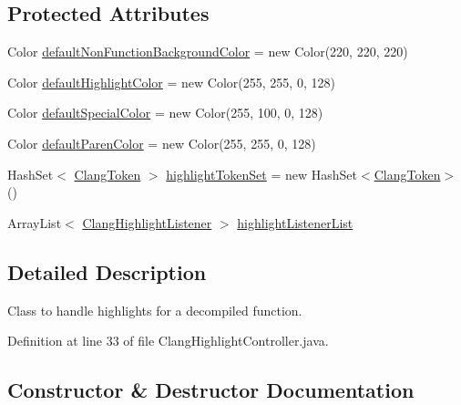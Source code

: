 \subsection*{Protected Attributes}
\begin{DoxyCompactItemize}
\item 
Color \mbox{\hyperlink{classghidra_1_1app_1_1decompiler_1_1component_1_1_clang_highlight_controller_a83b3026daf161b48e0d180a2c0935579}{default\+Non\+Function\+Background\+Color}} = new Color(220, 220, 220)
\item 
Color \mbox{\hyperlink{classghidra_1_1app_1_1decompiler_1_1component_1_1_clang_highlight_controller_a4998d07a38b79aef889e0289f09316cb}{default\+Highlight\+Color}} = new Color(255, 255, 0, 128)
\item 
Color \mbox{\hyperlink{classghidra_1_1app_1_1decompiler_1_1component_1_1_clang_highlight_controller_af737e94a8a7239465aa73791f9bb7894}{default\+Special\+Color}} = new Color(255, 100, 0, 128)
\item 
Color \mbox{\hyperlink{classghidra_1_1app_1_1decompiler_1_1component_1_1_clang_highlight_controller_a2fefc6fda8df68fd72749804eecbff5f}{default\+Paren\+Color}} = new Color(255, 255, 0, 128)
\item 
Hash\+Set$<$ \mbox{\hyperlink{classghidra_1_1app_1_1decompiler_1_1_clang_token}{Clang\+Token}} $>$ \mbox{\hyperlink{classghidra_1_1app_1_1decompiler_1_1component_1_1_clang_highlight_controller_a5fac1cc729ad200de5659b7752772608}{highlight\+Token\+Set}} = new Hash\+Set$<$\mbox{\hyperlink{classghidra_1_1app_1_1decompiler_1_1_clang_token}{Clang\+Token}}$>$()
\item 
Array\+List$<$ \mbox{\hyperlink{interfaceghidra_1_1app_1_1decompiler_1_1component_1_1_clang_highlight_listener}{Clang\+Highlight\+Listener}} $>$ \mbox{\hyperlink{classghidra_1_1app_1_1decompiler_1_1component_1_1_clang_highlight_controller_a55d2732b30a1d26cf992a310e0e8d276}{highlight\+Listener\+List}}
\end{DoxyCompactItemize}


\subsection{Detailed Description}
Class to handle highlights for a decompiled function. 

Definition at line 33 of file Clang\+Highlight\+Controller.\+java.



\subsection{Constructor \& Destructor Documentation}
\mbox{\label{classghidra_1_1app_1_1decompiler_1_1component_1_1_clang_highlight_controller_acb762e5a9363b0d4fc31259911170beb}} 
